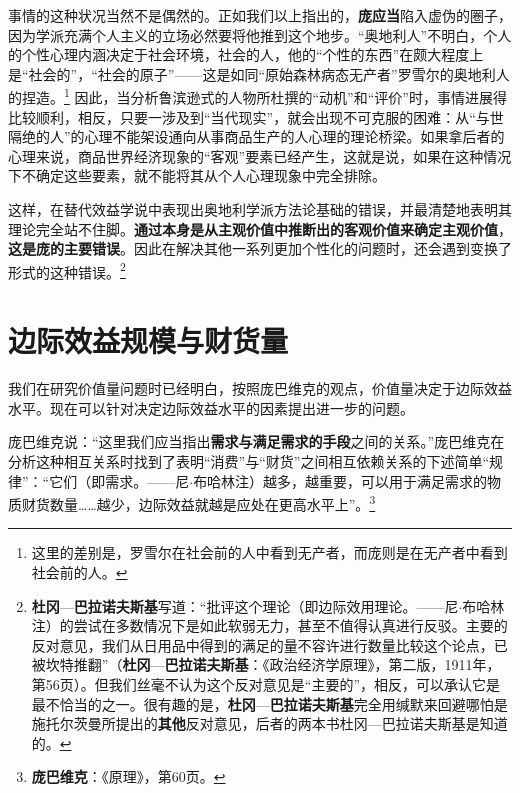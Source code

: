 \documentclass[fontset=fandol, a4paper, 12pt, openright]{ctexbook}
\begin{document}
事情的这种状况当然不是偶然的。正如我们以上指出的，\textbf{庞应当}陷入虚伪的圈子，因为学派充满个人主义的立场必然要将他推到这个地步。“奥地利人”不明白，个人的个性心理内涵决定于社会环境，社会的人，他的“个性的东西”在颇大程度上是“社会的”，“社会的原子”——这是如同“原始森林病态无产者”罗雪尔的奥地利人的捏造。\footnote{这里的差别是，罗雪尔在社会前的人中看到无产者，而庞则是在无产者中看到社会前的人。} 因此，当分析鲁滨逊式的人物所杜撰的“动机”和“评价”时，事情进展得比较顺利，相反，只要一涉及到“当代现实”，就会出现不可克服的困难：从“与世隔绝的人”的心理不能架设通向从事商品生产的人心理的理论桥梁。如果拿后者的心理来说，商品世界经济现象的“客观”要素已经产生，这就是说，如果在这种情况下不确定这些要素，就不能将其从个人心理现象中完全排除。

这样，在替代效益学说中表现出奥地利学派方法论基础的错误，并最清楚地表明其理论完全站不住脚。\textbf{通过本身是从主观价值中推断出的客观价值来确定主观价值}，\textbf{这是庞的主要错误}。因此在解决其他一系列更加个性化的问题时，还会遇到变换了形式的这种错误。\footnote{\textbf{杜冈}—\textbf{巴拉诺夫斯基}写道：“批评这个理论（即边际效用理论。——尼$\cdot$布哈林注）的尝试在多数情况下是如此软弱无力，甚至不值得认真进行反驳。主要的反对意见，我们从日用品中得到的满足的量不容许进行数量比较这个论点，已被坎特推翻”（\textbf{杜冈}—\textbf{巴拉诺夫斯基}：《政治经济学原理》，第二版，1911年，第56页）。但我们丝毫不认为这个反对意见是“主要的”，相反，可以承认它是最不恰当的之一。很有趣的是，\textbf{杜冈}—\textbf{巴拉诺夫斯基}完全用缄默来回避哪怕是施托尔茨曼所提出的\textbf{其他}反对意见，后者的两本书杜冈—巴拉诺夫斯基是知道的。}

\section{边际效益规模与财货量}

我们在研究价值量问题时已经明白，按照庞巴维克的观点，价值量决定于边际效益水平。现在可以针对决定边际效益水平的因素提出进一步的问题。

庞巴维克说：“这里我们应当指出\textbf{需求与满足需求的手段}之间的关系。”庞巴维克在分析这种相互关系时找到了表明“消费”与“财货”之间相互依赖关系的下述简单“规律”：“它们（即需求。——尼$\cdot$布哈林注）越多，越重要，可以用于满足需求的物质财货数量……越少，边际效益就越是应处在更高水平上”。\footnote{\textbf{庞巴维克}：《原理》，第60页。}
\end{document}
